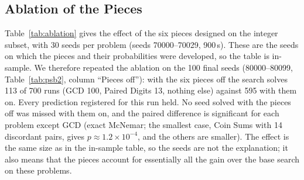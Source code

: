 \documentclass[sigconf,nonacm]{acmart}
\begin{document}
\subsection{Ablation of the Pieces}
\label{sec:ablation}
Table~\ref{tab:ablation} gives the effect of the six pieces designed on the integer subset, with 30 seeds per problem (seeds 70000--70029, 900\,s). These are the seeds on which the pieces and their probabilities were developed, so the table is in-sample. We therefore repeated the ablation on the 100 final seeds (80000--80099, Table~\ref{tab:psb2}, column ``Pieces off''): with the six pieces off the search solves 113 of 700 runs (GCD 100, Paired Digits 13, nothing else) against 595 with them on. Every prediction registered for this run held. No seed solved with the pieces off was missed with them on, and the paired difference is significant for each problem except GCD (exact McNemar; the smallest case, Coin Sums with 14 discordant pairs, gives $p\approx1.2\times10^{-4}$, and the others are smaller). The effect is the same size as in the in-sample table, so the seeds are not the explanation; it also means that the pieces account for essentially all the gain over the base search on these problems.
\end{document}
